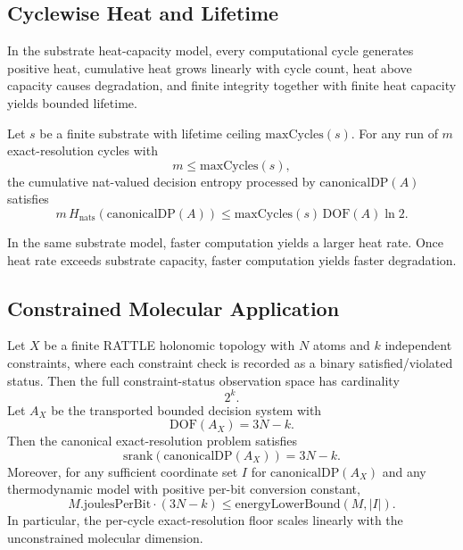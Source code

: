\subsection{Cyclewise Heat and Lifetime}

\begin{proposition}\label{prop:finite-lifetime}
In the substrate heat-capacity model, every computational cycle generates positive heat, cumulative heat grows linearly with cycle count, heat above capacity causes degradation, and finite integrity together with finite heat capacity yields bounded lifetime.
\end{proposition}

\begin{proposition}\label{prop:lifetime-throughput}
Let $s$ be a finite substrate with lifetime ceiling $\mathrm{maxCycles}(s)$. For any run of $m$ exact-resolution cycles with
\[
m \le \mathrm{maxCycles}(s),
\]
the cumulative nat-valued decision entropy processed by $\mathrm{canonicalDP}(A)$ satisfies
\[
m\,H_{\mathrm{nats}}(\mathrm{canonicalDP}(A))
\le
\mathrm{maxCycles}(s)\,\mathrm{DOF}(A)\ln 2.
\]
\end{proposition}

\begin{proposition}\label{prop:speed-heat-tradeoff}
In the same substrate model, faster computation yields a larger heat rate. Once heat rate exceeds substrate capacity, faster computation yields faster degradation.
\end{proposition}

\subsection{Constrained Molecular Application}

\begin{corollary}\label{cor:holonomic-landauer-floor}
Let $X$ be a finite RATTLE holonomic topology with $N$ atoms and $k$ independent constraints, where each constraint check is recorded as a binary satisfied/violated status. Then the full constraint-status observation space has cardinality
\[
2^k.
\]
Let $A_X$ be the transported bounded decision system with
\[
\mathrm{DOF}(A_X) = 3N-k.
\]
Then the canonical exact-resolution problem satisfies
\[
\mathrm{srank}(\mathrm{canonicalDP}(A_X)) = 3N-k.
\]
Moreover, for any sufficient coordinate set $I$ for $\mathrm{canonicalDP}(A_X)$ and any thermodynamic model with positive per-bit conversion constant,
\[
M.\mathrm{joulesPerBit}\cdot(3N-k)
\le
\mathrm{energyLowerBound}(M,|I|).
\]
In particular, the per-cycle exact-resolution floor scales linearly with the unconstrained molecular dimension.
\end{corollary}


